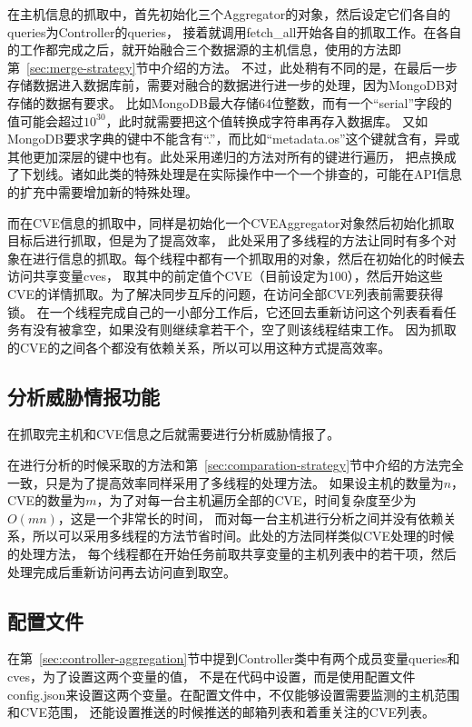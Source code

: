 在主机信息的抓取中，首先初始化三个Aggregator的对象，然后设定它们各自的queries为Controller的queries，
接着就调用fetch\_all开始各自的抓取工作。在各自的工作都完成之后，就开始融合三个数据源的主机信息，使用的方法即第~\ref{sec:merge-strategy}节中介绍的方法。
不过，此处稍有不同的是，在最后一步存储数据进入数据库前，需要对融合的数据进行进一步的处理，因为MongoDB对存储的数据有要求。
比如MongoDB最大存储64位整数，而有一个“serial”字段的值可能会超过$10^{30}$，此时就需要把这个值转换成字符串再存入数据库。
又如MongoDB要求字典的键中不能含有“.”，而比如“metadata.os”这个键就含有，异或其他更加深层的键中也有。此处采用递归的方法对所有的键进行遍历，
把点换成了下划线。诸如此类的特殊处理是在实际操作中一个一个排查的，可能在API信息的扩充中需要增加新的特殊处理。

而在CVE信息的抓取中，同样是初始化一个CVEAggregator对象然后初始化抓取目标后进行抓取，但是为了提高效率，
此处采用了多线程的方法让同时有多个对象在进行信息的抓取。每个线程中都有一个抓取用的对象，然后在初始化的时候去访问共享变量cves，
取其中的前定值个CVE（目前设定为100），然后开始这些CVE的详情抓取。为了解决同步互斥的问题，在访问全部CVE列表前需要获得锁。
在一个线程完成自己的一小部分工作后，它还回去重新访问这个列表看看任务有没有被拿空，如果没有则继续拿若干个，空了则该线程结束工作。
因为抓取的CVE的之间各个都没有依赖关系，所以可以用这种方式提高效率。

\subsection{分析威胁情报功能}
\label{sec:controller-analysis}

在抓取完主机和CVE信息之后就需要进行分析威胁情报了。

在进行分析的时候采取的方法和第~\ref{sec:comparation-strategy}节中介绍的方法完全一致，只是为了提高效率同样采用了多线程的处理方法。
如果设主机的数量为$n$，CVE的数量为$m$，为了对每一台主机遍历全部的CVE，时间复杂度至少为$O(mn)$，这是一个非常长的时间，
而对每一台主机进行分析之间并没有依赖关系，所以可以采用多线程的方法节省时间。此处的方法同样类似CVE处理的时候的处理方法，
每个线程都在开始任务前取共享变量的主机列表中的若干项，然后处理完成后重新访问再去访问直到取空。

\subsection{配置文件}
\label{sec:controller-config}

在第~\ref{sec:controller-aggregation}节中提到Controller类中有两个成员变量queries和cves，为了设置这两个变量的值，
不是在代码中设置，而是使用配置文件config.json来设置这两个变量。在配置文件中，不仅能够设置需要监测的主机范围和CVE范围，
还能设置推送的时候推送的邮箱列表和着重关注的CVE列表。

